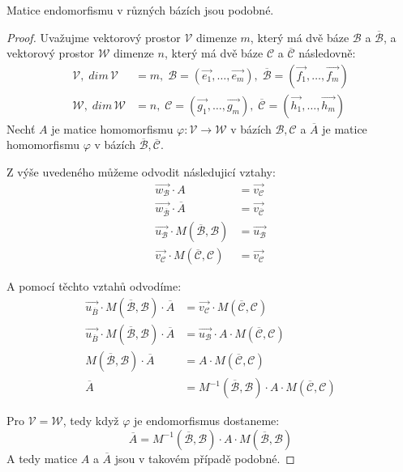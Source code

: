 \begin{theorem}
    Matice endomorfismu v různých bázích jsou podobné.
\end{theorem}
\begin{proof}
    Uvažujme vektorový prostor $\mathcal{V}$ dimenze $m$, který má dvě báze $\mathcal{B}$ a $\overline{\mathcal{B}}$,
    a vektorový prostor $\mathcal{W}$ dimenze $n$, který má dvě báze $\mathcal{C}$ a $\overline{\mathcal{C}}$ následovně:
    \begin{align*}
        \mathcal{V}, \; dim\,\mathcal{V} &= m, \; \mathcal{B} = (\vec{e_1}, \ldots, \vec{e_m}),\; \overline{\mathcal{B}} = (\vec{f_1}, \ldots, \vec{f_m})\\
        \mathcal{W}, \; dim\,\mathcal{W} &= n, \; \mathcal{C} = (\vec{g_1}, \ldots, \vec{g_m}),\; \overline{\mathcal{C}} = (\vec{h_1}, \ldots, \vec{h_m})
    \end{align*}
    Nechť $A$ je matice homomorfismu $\varphi: \mathcal{V} \rightarrow \mathcal{W}$ v bázích $\mathcal{B}, \mathcal{C}$
    a $\overline{A}$ je matice homomorfismu $\varphi$ v bázích $\overline{\mathcal{B}}, \overline{\mathcal{C}}$.

    Z výše uvedeného můžeme odvodit následujicí vztahy:
    \begin{align*}
        \vec{w_{\mathcal{B}}} \cdot A & = \vec{v_{\mathcal{C}}}\\
        \vec{w_{\overline{\mathcal{B}}}} \cdot \overline{A} & = \vec{v_{\overline{\mathcal{C}}}}\\
        \vec{u_{\mathcal{B}}} \cdot M(\overline{\mathcal{B}}, \mathcal{B}) & = \vec{u_{\mathcal{B}}}\\
        \vec{v_{\mathcal{C}}} \cdot M(\overline{\mathcal{C}}, \mathcal{C}) & = \vec{v_{\mathcal{C}}}
    \end{align*}

    A pomocí těchto vztahů odvodíme:
    \begin{align*}
        \vec{u_{\overline{B}}} \cdot M(\overline{\mathcal{B}}, \mathcal{B}) \cdot \overline{A}
            &= \vec{v_{\mathcal{C}}} \cdot M(\overline{\mathcal{C}}, \mathcal{C})\\
        \vec{u_{\overline{B}}} \cdot M(\overline{\mathcal{B}}, \mathcal{B}) \cdot \overline{A}
            &= \vec{u_{\mathcal{B}}} \cdot A \cdot M(\overline{\mathcal{C}}, \mathcal{C}) \\
        M(\overline{\mathcal{B}}, \mathcal{B}) \cdot \overline{A} &=
            A \cdot M(\overline{\mathcal{C}}, \mathcal{C})\\
        \overline{A} &=
            M^{-1}(\overline{\mathcal{B}}, \mathcal{B}) \cdot A \cdot M(\overline{\mathcal{C}}, \mathcal{C})
    \end{align*}

    Pro $\mathcal{V} = \mathcal{W}$, tedy když $\varphi$ je endomorfismus dostaneme:
    $$\overline{A} = M^{-1}(\overline{\mathcal{B}}, \mathcal{B}) \cdot A \cdot M(\overline{\mathcal{B}}, \mathcal{B})$$
    A tedy matice $A$ a $\overline{A}$ jsou v takovém případě podobné.
\end{proof}


